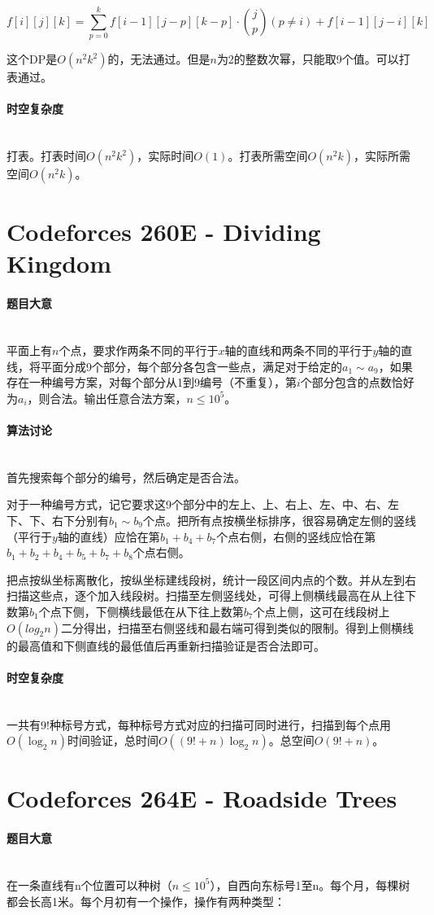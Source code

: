 \documentclass[UTF8]{ctexart}
\newcommand{\myparagraph}[1]{\paragraph{#1}\mbox{}\\}
\theoremstyle{nonumberplain}
\begin{document}
			$$f[i][j][k]=\sum_{p=0}^k f[i-1][j-p][k-p] \cdot \binom{j}{p} (p\not=i) + f[i-1][j-i][k]$$
			
			这个DP是$O(n^2k^2)$的，无法通过。但是$n$为2的整数次幂，只能取9个值。可以打表通过。
		
		\myparagraph{时空复杂度}
		
			打表。打表时间$O(n^2k^2)$，实际时间$O(1)$。打表所需空间$O(n^2k)$，实际所需空间$O(n^2k)$。
	
	\section{Codeforces 260E - Dividing Kingdom}
	
		\myparagraph{题目大意}
		
			平面上有$n$个点，要求作两条不同的平行于$x$轴的直线和两条不同的平行于$y$轴的直线，将平面分成9个部分，每个部分各包含一些点，满足对于给定的$a_1 \sim a_9$，如果存在一种编号方案，对每个部分从1到9编号（不重复），第$i$个部分包含的点数恰好为$a_i$，则合法。输出任意合法方案，$n \leq 10^5$。
		
		\myparagraph{算法讨论}
		
			首先搜索每个部分的编号，然后确定是否合法。
			
			对于一种编号方式，记它要求这9个部分中的左上、上、右上、左、中、右、左下、下、右下分别有$b_1 \sim b_9$个点。把所有点按横坐标排序，很容易确定左侧的竖线（平行于$y$轴的直线）应恰在第$b_1+b_4+b_7$个点右侧，右侧的竖线应恰在第$b_1+b_2+b_4+b_5+b_7+b_8$个点右侧。
			
			把点按纵坐标离散化，按纵坐标建线段树，统计一段区间内点的个数。并从左到右扫描这些点，逐个加入线段树。扫描至左侧竖线处，可得上侧横线最高在从上往下数第$b_1$个点下侧，下侧横线最低在从下往上数第$b_7$个点上侧，这可在线段树上$O(log_2n)$二分得出，扫描至右侧竖线和最右端可得到类似的限制。得到上侧横线的最高值和下侧直线的最低值后再重新扫描验证是否合法即可。
		
		\myparagraph{时空复杂度}
		
			一共有$9!$种标号方式，每种标号方式对应的扫描可同时进行，扫描到每个点用$O(\log_2n)$时间验证，总时间$O((9!+n)\log_2n)$。总空间$O(9!+n)$。
	
	\section{Codeforces 264E - Roadside Trees}
	
		\myparagraph{题目大意}
		
			在一条直线有n个位置可以种树（$n \leq 10^5$），自西向东标号1至n。每个月，每棵树都会长高1米。每个月初有一个操作，操作有两种类型：
			
\end{document}

